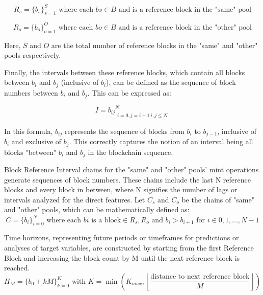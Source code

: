 \documentclass{article}
\begin{document}
{\begin{equation}
R_{s} = \{b_{s}\}_{s=1}^{S} \text{ where each } b{s} \in B \text{ and is a reference block in the "same" pool}
\end{equation}

\begin{equation}
R_{o} = \{b_{o}\}_{o=1}^{O} \text{ where each } b{o} \in B \text{ and is a reference block in the "other" pool}
\end{equation}

Here, $S$ and $O$ are the total number of reference blocks in the "same" and "other" pools respectively.

Finally, the intervals between these reference blocks, which contain all blocks between $b_i$ and $b_j$ (inclusive of $b_i$), can be defined as the sequence of block numbers between $b_i$ and $b_j$. This can be expressed as:

\begin{equation}
I = {b_{ij}}_{\substack{i=0,j=i+1 \ i,j\leq N}}^N
\end{equation}

In this formula, $b_{ij}$ represents the sequence of blocks from $b_i$ to $b_{j-1}$, inclusive of $b_i$ and exclusive of $b_j$. This correctly captures the notion of an interval being all blocks "between" $b_i$ and $b_j$ in the blockchain sequence.


Block Reference Interval chains for the "same" and "other" pools' mint operations generate sequences of block numbers. These chains include the last N reference blocks and every block in between, where N signifies the number of lags or intervals analyzed for the direct features. Let $C_{s}$ and $C_{o}$ be the chains of "same" and "other" pools, which can be mathematically defined as:
\begin{equation}
  C = \{b_{i}\}_{i=0}^{N} \text{ where each } b{i} \text{ is a block} \in {R_s, R_o} \text{ and } b_{i} > b_{i+1} \text{ for } i \in {0,1,...,N-1}
  \end{equation}

Time horizons, representing future periods or timeframes for predictions or analyses of target variables, are constructed by starting from the first Reference Block and increasing the block count by M until the next reference block is reached. 
\begin{equation}
  H_{M} = \{b_{0}+kM\}_{k=0}^{K} \text{ with } K = \min \left( K_{max}, \left\lfloor \frac{\text{distance to next reference block}}{M} \right\rfloor \right)
  \end{equation}

}
\end{document}
